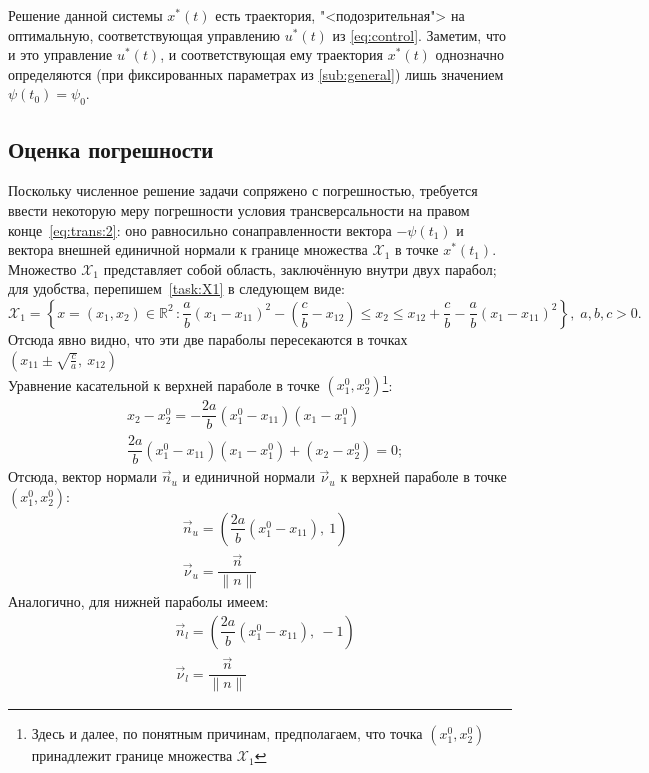\documentclass[11pt, oneside, final]{article}
\theoremstyle{break}
\numberwithin{equation}{section}
\theoremstyle{plain}
\theoremstyle{definition}
\newcommand \real{\mathbb{R}}
\begin{document}
    Решение данной системы \(x^{*}(t)\) есть траектория, "<подозрительная"> на оптимальную, соответствующая управлению \(u^{*}(t)\) из \eqref{eq:control}. Заметим, что и это управление \(u^{*}(t)\), и соответствующая ему траектория \(x^{*}(t)\) однозначно определяются (при фиксированных параметрах из \ref{sub:general}) лишь значением \(\psi(t_0) = \psi_0\).
    \subsection{Оценка погрешности} %
    \label{sub:right_trans}
    Поскольку численное решение задачи сопряжено с погрешностью, требуется ввести некоторую меру погрешности условия трансверсальности на правом конце~\eqref{eq:trans:2}: оно равносильно сонаправленности вектора \(-\psi(t_1)\) и вектора внешней единичной нормали к границе множества \(\mathcal{X}_1\) в точке \(x^{*}(t_1)\).
    Множество \(\mathcal{X}_1\) представляет собой область, заключённую внутри двух парабол; для удобства, перепишем~\eqref{task:X1} в следующем виде:
    \[
        \mathcal{X}_1 = \left\{ x = (x_1, x_2) \in \real^2 \, \colon \dfrac{a}{b}(x_1 - x_{11})^2 - (\dfrac{c}{b} - x_{12})\leqslant x_2 
        \leqslant x_{12} + \dfrac{c}{b} - \dfrac{a}{b}(x_1 - x_{11})^2 \right\}, \; a, b, c > 0.
    \]
    Отсюда явно видно, что эти две параболы пересекаются в точках \(\left(x_{11} \pm \sqrt{\frac{c}{a}}, \: x_{12} \right)\)\\
    Уравнение касательной к верхней параболе в точке \(\left(x_1^0, x_2^0\right)\)\footnote{Здесь и далее, по понятным причинам, предполагаем, что точка \(\left(x_1^0, x_2^0\right)\) принадлежит границе множества \(\mathcal{X}_1\)}:
    \begin{align*}
        & x_2 - x_2^0 = -\dfrac{2a}{b}(x_1^0 - x_{11})(x_1 - x_1^0) \\
        & \dfrac{2a}{b}(x_1^0 - x_{11})(x_1 - x_1^0) + (x_2 - x_2^0) = 0;
    \end{align*}
    Отсюда, вектор нормали \(\vec n_u\) и единичной нормали \(\vec \nu_u\) к верхней параболе в точке \(\left(x_1^0, x_2^0\right)\):
    \begin{align*}
        &\vec n_u = \left( \dfrac{2a}{b} (x_1^0 - x_{11}), \: 1 \right) \\
        &\vec \nu_u = \dfrac{\vec n}{\|n\|}
    \end{align*}
    Аналогично, для нижней параболы имеем:
    \begin{align*}
        &\vec n_l = \left( \dfrac{2a}{b} (x_1^0 - x_{11}), \: -1 \right) \\
        &\vec \nu_l = \dfrac{\vec n}{\|n\|}
    \end{align*}
\end{document}
